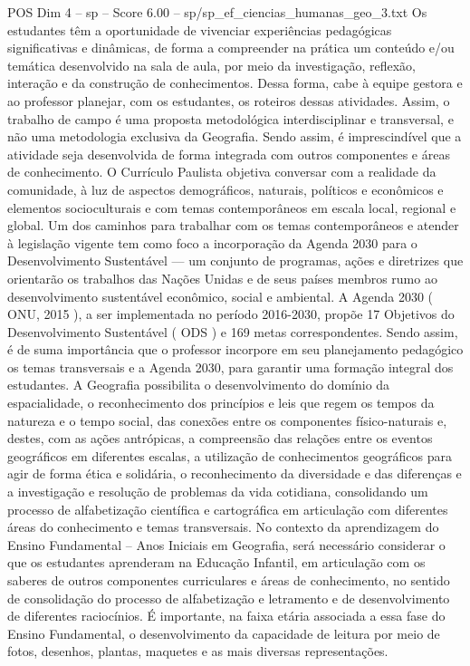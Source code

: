 \begin{textsample}{POS Dim 4 – sp – Score 6.00 – sp/sp\_ef\_ciencias\_humanas\_geo\_3.txt}
Os estudantes têm a oportunidade de vivenciar experiências pedagógicas significativas e dinâmicas, de forma a compreender na prática um conteúdo e/ou temática desenvolvido na sala de aula, por meio da investigação, reflexão, interação e da construção de conhecimentos.
Dessa forma, cabe à equipe gestora e ao professor planejar, com os estudantes, os roteiros dessas atividades.
Assim, o trabalho de campo é uma proposta metodológica interdisciplinar e transversal, e não uma metodologia exclusiva da Geografia.
Sendo assim, é imprescindível que a atividade seja desenvolvida de forma integrada com outros componentes e áreas de conhecimento.
O Currículo Paulista objetiva conversar com a realidade da comunidade, à luz de aspectos demográficos, naturais, políticos e econômicos e elementos socioculturais e com temas contemporâneos em escala local, regional e global.
Um dos caminhos para trabalhar com os temas contemporâneos e atender à legislação vigente tem como foco a incorporação da Agenda 2030 para o Desenvolvimento Sustentável — um conjunto de programas, ações e diretrizes que orientarão os trabalhos das Nações Unidas e de seus países membros rumo ao desenvolvimento sustentável econômico, social e ambiental.
A Agenda 2030 ( ONU, 2015 ), a ser implementada no período 2016-2030, propõe 17 Objetivos do Desenvolvimento Sustentável ( ODS ) e 169 metas correspondentes.
Sendo assim, é de suma importância que o professor incorpore em seu planejamento pedagógico os temas transversais e a Agenda 2030, para garantir uma formação integral dos estudantes.
A Geografia possibilita o desenvolvimento do domínio da espacialidade, o reconhecimento dos princípios e leis que regem os tempos da natureza e o tempo social, das conexões entre os componentes físico-naturais e, destes, com as ações antrópicas, a compreensão das relações entre os eventos geográficos em diferentes escalas, a utilização de conhecimentos geográficos para agir de forma ética e solidária, o reconhecimento da diversidade e das diferenças e a investigação e resolução de problemas da vida cotidiana, consolidando um processo de alfabetização científica e cartográfica em articulação com diferentes áreas do conhecimento e temas transversais.
No contexto da aprendizagem do Ensino Fundamental – Anos Iniciais em Geografia, será necessário considerar o que os estudantes aprenderam na Educação Infantil, em articulação com os saberes de outros componentes curriculares e áreas de conhecimento, no sentido de consolidação do processo de alfabetização e letramento e de desenvolvimento de diferentes raciocínios.
É importante, na faixa etária associada a essa fase do Ensino Fundamental, o desenvolvimento da capacidade de leitura por meio de fotos, desenhos, plantas, maquetes e as mais diversas representações.

\end{textsample}
